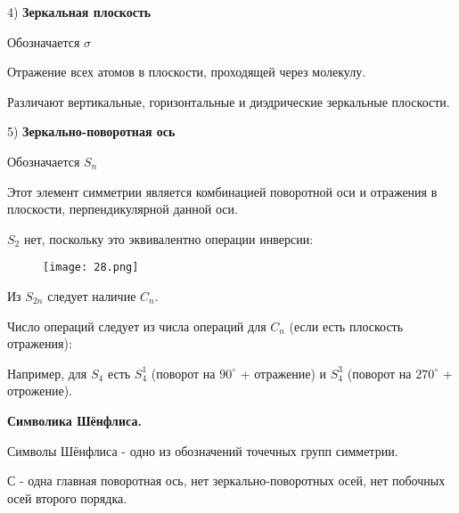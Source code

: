 4) \textbf{Зеркальная плоскость}

\par\smallskip

Обозначается $\sigma$

\par\smallskip

Отражение всех атомов в плоскости, проходящей через
молекулу.

\par\smallskip
Различают вертикальные, горизонтальные и диэдрические
зеркальные плоскости.

\par\smallskip

5) \textbf{Зеркально-поворотная ось}

\par\smallskip 

Обозначается $S_n$

\par\smallskip

Этот элемент симметрии является комбинацией поворотной
оси и отражения в плоскости, перпендикулярной данной оси.

\par\smallskip

$S_2$ нет, поскольку это эквивалентно операции инверсии:

\begin{figure}[H]
	\centering
	{\texttt{[image: 28.png]}}
\end{figure}

Из $S_{2n}$ следует наличие $C_n$.

\par\smallskip

	
Число операций следует из числа операций для $C_n$ (если есть
плоскость отражения):

\par\smallskip

Например, для $S_4$ есть $S_4^1$ (поворот на $90^\circ$ + отражение)	и $S_4^3$ (поворот на $270^\circ$ + отрожение).

\begin{center}
\textbf{Символика Шёнфлиса.}
\end{center}	

Символы Шёнфлиса - одно из обозначений точечных групп
симметрии.

\par\smallskip

С - одна главная поворотная ось, нет зеркально-поворотных осей,
нет побочных осей второго порядка.

